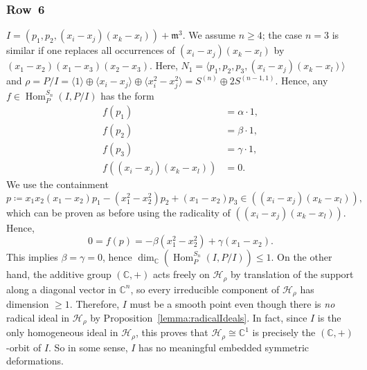 \documentclass[11pt]{amsart}
\theoremstyle{definition}
\newcommand{\CC}{\mathbb{C}}
\newcommand{\mm}{\mathfrak{m}}
\newcommand{\HH}{\mathcal{H}}
\DeclareMathOperator{\Hom}{Hom}
\begin{document}
\subsubsection{Row~6} $I = (p_1,p_2,(x_i-x_j)(x_k-x_l)) + \mm^3$. We assume $n \geq 4$; the case $n=3$ is similar if one replaces all occurrences of $(x_i-x_j)(x_k-x_l)$ by $(x_1-x_2)(x_1-x_3)(x_2-x_3)$. Here, $N_1 = \langle p_1, p_2, p_3, (x_i-x_j)(x_k-x_l)\rangle$ and $\rho = P/I = \langle 1 \rangle \oplus \langle x_i - x_j \rangle \oplus \langle x_i^2 - x_j^2 \rangle = S^{(n)} \oplus 2S^{(n-1,1)}$. Hence, any $f \in \Hom^{S_n}_{P}(I,P/I)$ has the form
\begin{align*}
    f(p_1) &= \alpha \cdot 1, \\
    f(p_2) &= \beta \cdot 1, \\
    f(p_3) &= \gamma \cdot 1, \\
    f((x_i-x_j)(x_k-x_l)) &= 0.
\end{align*}
We use the containment
\begin{equation*}
    p \coloneqq x_1 x_2 (x_1-x_2) p_1 - (x_1^2 - x_2^2) p_2 + (x_1 - x_2) p_3 \in ((x_i-x_j)(x_k-x_l)),
\end{equation*}
which can be proven as before using the radicality of $((x_i-x_j)(x_k-x_l))$. Hence,
\begin{equation*}
    0 = f(p) = - \beta (x_1^2 - x_2^2) + \gamma (x_1 - x_2).
\end{equation*}
This implies $\beta = \gamma = 0$, hence $\dim_\CC(\Hom^{S_n}_P(I,P/I)) \leq 1$. On the other hand, the additive group $(\CC,+)$ acts freely on $\HH_\rho$ by translation of the support along a diagonal vector in $\CC^n$, so every irreducible component of $\HH_\rho$ has dimension $\geq 1$. Therefore, $I$ must be a smooth point even though there is \emph{no} radical ideal in $\HH_\rho$ by Proposition~\ref{lemma:radicalIdeals}. In fact, since $I$ is the only homogeneous ideal in $\HH_\rho$, this proves that $\HH_\rho \cong \CC^1$ is precisely the $(\CC,+)$-orbit of $I$. So in some sense, $I$ has no meaningful embedded symmetric deformations. 
\end{document}

